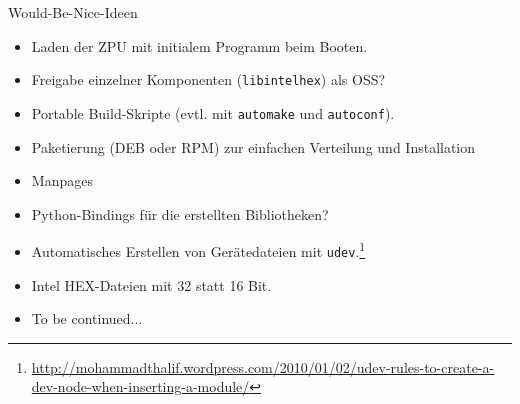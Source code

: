 \documentclass[10pt]{beamer}
\begin{document}
	\begin{frame}{Would-Be-Nice-Ideen}
		\begin{itemize}
			\item Laden der ZPU mit initialem Programm beim Booten.
			\item Freigabe einzelner Komponenten (\texttt{libintelhex}) als OSS?
			\item Portable Build-Skripte (evtl. mit \texttt{automake} und \texttt{autoconf}).
			\item Paketierung (DEB oder RPM) zur einfachen Verteilung und Installation
			\item Manpages
			\item Python-Bindings für die erstellten Bibliotheken?
			\item Automatisches Erstellen von Gerätedateien mit \texttt{udev}.\footnote{\url{http://mohammadthalif.wordpress.com/2010/01/02/udev-rules-to-create-a-dev-node-when-inserting-a-module/}}
			\item Intel HEX-Dateien mit 32 statt 16 Bit.
			\item To be continued...
		\end{itemize}
	\end{frame}
\end{document}
